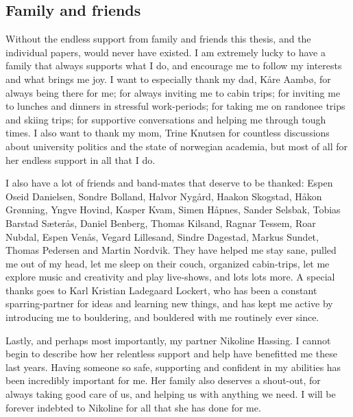 \subsection*{Family and friends}

Without the endless support from family and friends this thesis, and the individual papers, would never have existed. I am extremely lucky to have a family that always supports what I do, and encourage me to follow my interests and what brings me joy. I want to especially thank my dad, Kåre Aambø, for always being there for me; for always inviting me to cabin trips; for inviting me to lunches and dinners in stressful work-periods; for taking me on randonee trips and skiing trips; for supportive conversations and helping me through tough times. I also want to thank my mom, Trine Knutsen for countless discussions about university politics and the state of norwegian academia, but most of all for her endless support in all that I do. 

I also have a lot of friends and band-mates that deserve to be thanked: Espen Oseid Danielsen, Sondre Bolland, Halvor Nygård, Haakon Skogstad, Håkon Grønning, Yngve Hovind, Kasper Kvam, Simen Håpnes, Sander Selsbak, Tobias Barstad Sæterås, Daniel Benberg, Thomas Kilsand, Ragnar Tessem, Roar Nubdal, Espen Venås, Vegard Lillesand, Sindre Dagestad, Markus Sundet, Thomas Pedersen and Martin Nordvik. They have helped me stay sane, pulled me out of my head, let me sleep on their couch, organized cabin-trips, let me explore music and creativity and play live-shows, and lots lots more. A special thanks goes to Karl Kristian Ladegaard Lockert, who has been a constant sparring-partner for ideas and learning new things, and has kept me active by introducing me to bouldering, and bouldered with me routinely ever since. 

Lastly, and perhaps most importantly, my partner Nikoline Hassing. I cannot begin to describe how her relentless support and help have benefitted me these last years. Having someone so safe, supporting and confident in my abilities has been incredibly important for me. Her family also deserves a shout-out, for always taking good care of us, and helping us with anything we need. I will be forever indebted to Nikoline for all that she has done for me. 


